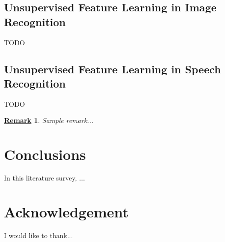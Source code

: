 \documentclass[conference]{IEEEtran}
\newtheorem{remark}{\underline{Remark}}
\begin{document}
\subsection{Unsupervised Feature Learning in Image Recognition}
TODO

\subsection{Unsupervised Feature Learning in Speech Recognition}
TODO





\begin{remark}
Sample remark...
\end{remark}


\section{Conclusions}

In this literature survey, ...

\section*{Acknowledgement}
I would like to thank...
\end{document}
